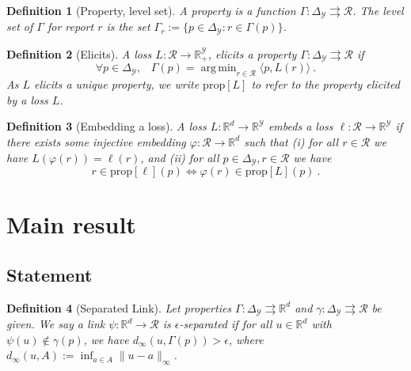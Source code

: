 \documentclass[12pt]{article}
\newcommand{\reals}{\mathbb{R}}
\newcommand{\prop}[1]{\mathrm{prop}[#1]}
\newcommand{\simplex}{\Delta_\Y}
\newcommand{\R}{\mathcal{R}}
\newcommand{\Y}{\mathcal{Y}}
\newcommand{\inprod}[2]{\langle #1, #2 \rangle}%
\newcommand{\toto}{\rightrightarrows}
\DeclareMathOperator*{\argmin}{arg\,min}
\newtheorem{definition}{Definition}
\begin{document}
\begin{definition}[Property, level set]\label{def:property}
  A \emph{property} is a function $\Gamma:\simplex\toto\R$.
  The \emph{level set} of $\Gamma$ for report $r$ is the set $\Gamma_r := \{p \in \simplex : r \in \Gamma(p)\}$.
\end{definition}

\begin{definition}[Elicits]
  \label{def:elicits}
  A loss $L:\R\to\reals^\Y_+$, \emph{elicits} a property $\Gamma:\simplex \toto \R$ if
  \begin{equation}
    \forall p\in\simplex,\;\;\;\Gamma(p) = \argmin_{r \in \R} \inprod{p}{L(r)}~.
  \end{equation}
  As $L$ elicits a unique property, we write $\prop{L}$ to refer to the property elicited by a loss $L$.
\end{definition}

\begin{definition}[Embedding a loss]\label{def:loss-embed}
  A loss $L:\reals^d\to\reals^\Y$ \emph{embeds} a loss $\ell:\R\to\reals^\Y$ if there exists some injective embedding $\varphi:\R\to\reals^d$ such that
  (i) for all $r\in\R$ we have $L(\varphi(r)) = \ell(r)$, and (ii) for all $p\in\simplex,r\in\R$ we have
  \begin{equation}\label{eq:embed-loss}
    r \in \prop{\ell}(p) \iff \varphi(r) \in \prop{L}(p)~.
  \end{equation}
\end{definition}
%

\section{Main result}

\subsection{Statement}

\begin{definition}[Separated Link]\label{def:sep-link}
  Let properties $\Gamma:\simplex\toto\reals^d$ and $\gamma:\simplex\toto\R$ be given.
  We say a link $\psi:\reals^d\to\R$
  is \emph{$\epsilon$-separated} if for all $u\in\reals^d$ with $\psi(u)\notin\gamma(p)$, we have $d_\infty(u,\Gamma(p)) > \epsilon$, where $d_\infty(u,A) := \inf_{a\in A} \|u-a\|_\infty$.
\end{definition}
\end{document}

